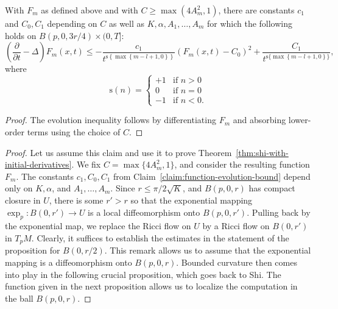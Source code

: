 \begin{claim}\label{claim:function-evolution-bound}

\label{Fm}
 With $F_m$ as defined above and with $C\ge \max(4A^2_m,1)$,
there are constants $c_1$ and $C_0,C_1$ depending on $C$ as well as
$K,\alpha,A_1,\ldots,A_m$ for which the following holds on
$B(p,0,3r/4)\times (0,T]$:
$$
\left(  \frac{\partial}{\partial t}-\Delta\right)
F_{m}(x,t)\leq-\frac {c_1}{t^{\mathrm{s}\left\{  \max\left\{
m-l+1,0\right\}  \right\} }}\left( F_{m}(x,t)-C_0\right)
^{2}+\frac{C_1}{t^{\mathrm{s}\{\max\left\{ m-l+1,0\right\} \} }},
$$
where
$$\mathrm{s}(n)=\begin{cases} +1 & \text{if } n>0 \\ 0 & \text{if }n=0 \\ -1&
\text{if }n<0.\end{cases}$$
\end{claim}

\begin{proof}
\sketch The evolution inequality follows by differentiating $F_m$ and
absorbing lower-order terms using the choice of $C$.
\end{proof}

\begin{proof}
\sketch Let us assume this claim and use it to prove Theorem~\ref{thm:shi-with-initial-derivatives}. We fix
$C=\max\{4A_m^2,1\}$, and consider the resulting function $F_m$. The
constants $c_1,C_0,C_1$ from Claim~\ref{claim:function-evolution-bound} depend only on $K,\alpha$, and
$A_1,\ldots,A_m$. Since $r\le \pi/2\sqrt{K}$, and $B(p,0,r)$ has
compact closure in $U$, there is some $r'>r$ so that the exponential
mapping $\exp_p\colon B(0,r')\to U$ is a local diffeomorphism
onto $B(p,0,r')$. Pulling back by the exponential map, we  replace
the Ricci flow on $U$ by a Ricci flow on $B(0,r')$ in $T_pM$.
Clearly, it suffices to establish the estimates in the statement of
the proposition for $B(0,r/2)$. This remark allows us to assume that
the exponential mapping is a diffeomorphism onto $B(p,0,r)$. Bounded
curvature then comes into play in the following crucial proposition,
which goes back to Shi. The function given in the next proposition allows us to localize
the computation in the ball $B(p,0,r)$.
\end{proof}

